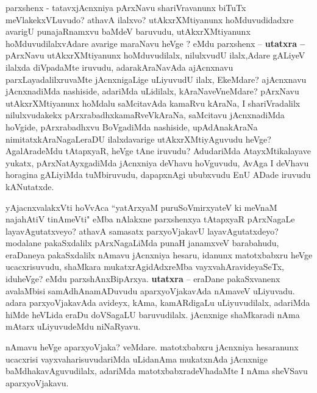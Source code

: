 \centerline{}

\begin{artha}
parxshenx - tatavxjAcnxniya pArxNavu shariVravanunx biTuTx meVlakekxVLuvudo? athavA ilalxvo? utAkxrXMtiyanunx hoMduvudidadxre avarigU punajaRnamxvu baMdeV baruvudu, utAkxrXMtiyanunx hoMduvudilalxvAdare avarige maraNavu heVge	? eMdu parxshenx --
\textbf{utatxra --} pArxNavu utAkxrXMtiyanunx hoMduvudilalx, nilulxvudU ilalx,Adare gALiyeV ilalxda diVpadaMte iruvudu, adarakAraNavAda ajAcnxnavu parxLayadalilxruvaMte jAcnxnigaLige uLiyuvudU ilalx, EkeMdare? ajAcnxnavu jAcnxnadiMda nashiside, adariMda uLidilalx, kAraNaveVneMdare? pArxNavu utAkxrXMtiyanunx hoMdalu saMcitavAda kamaRvu kAraNa, I shariVradalilx nilulxvudakekx pArxrabadhxkamaRveVkAraNa, saMcitavu jAcnxnadiMda hoVgide, pArxrabadhxvu BoVgadiMda nashiside, upAdAnakAraNa nimitatxkAraNagaLeraDU ilalxdavarige utAkxrXMtiyAguvudu heVge? AgalAradeMdu tAtapxyaR, heVge tAne iruvudu? AdudariMda AtayxMtikalayave yukatx, pArxNatAyxgadiMda jAcnxniya deVhavu hoVguvudu, AvAga I deVhavu horagina gALiyiMda tuMbiruvudu, dapapxnAgi ububxvudu EnU ADade iruvudu kANutatxde.
\end{artha}

\begin{artha}
yAjacnxvalakxVti hoVvAca ``yatArxyaM puruSoVmirxyateV ki meVnaM  naja{\null}hAtiV tinAmeVti" eMba nAlakxne parxshenxya tAtapxyaR pArxNagaLe layavAgutatxveyo? athavA samasatx parxyoVjakavU layavAgutatxdeyo? modalane pakaSxdalilx pArxNagaLiMda punaH janamxveV barabahudu, eraDaneya pakaSxdalilx nAmavu jAcnxniya hesaru, idanunx matotxbabxru heVge ucacxrisuvudu, shaMkara mukatxrAgidAdxreMba vayxvahAravideyaSeTx, iduheVge? eMdu parxshAnxBipArxya. \textbf{utatxra} -- eraDane pakaSxvanenx avalaMbisi samAdhAnamADuvudu aparxyoVjakavAda nAmaveV uLiyuvadu. adara parxyoVjakavAda avideyx, kAma, kamARdigaLu uLiyuvudilalx, adariMda hiMde heVLida eraDu doVSagaLU baruvudilalx. jAcnxnige shaMkaradi nAma mAtarx  uLiyuvudeMdu niNaRyavu.

nAmavu heVge aparxyoVjaka? veMdare. matotxbabxru jAcnxniya hesaranunx ucacxrisi vayxvaharisuvudariMda uLidanAma mukatxnAda jAcnxnige baMdhakavAguvudilalx, adariMda matotxbabxradeVhadaMte I nAma sheVSavu aparxyoVjakavu.
\end{artha}

\centerline{}

